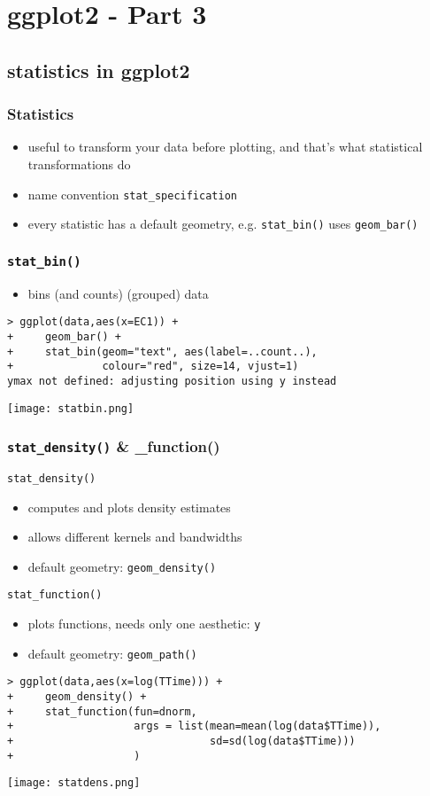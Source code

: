 \section{ggplot2 - Part 3}
\subsection{statistics in ggplot2}
\begin{frame}\frametitle{Statistics}
  \begin{itemize}
  \item useful to transform your data before plotting, and that's what statistical transformations do
  \item name convention \texttt{stat\_specification}
  \item every statistic has a default geometry, e.g. \texttt{stat\_bin()} uses \texttt{geom\_bar()}
  \end{itemize}
\end{frame}


\begin{frame}\frametitle{\texttt{stat\_bin()}}
  \begin{itemize}
  \item bins (and counts) (grouped) data 
  \end{itemize}
\small
\begin{verbatim}
> ggplot(data,aes(x=EC1)) +
+     geom_bar() +
+     stat_bin(geom="text", aes(label=..count..),
+              colour="red", size=14, vjust=1)
ymax not defined: adjusting position using y instead
\end{verbatim}
\begin{center}
  \texttt{[image: statbin.png]}
\end{center}
\end{frame}


\begin{frame}\frametitle{\texttt{stat\_density()} \& \_function()}
\texttt{stat\_density()}
  \begin{itemize}
  \item computes and plots density estimates
  \item allows different kernels and bandwidths
  \item default geometry: \texttt{geom\_density()}
  \end{itemize}
\texttt{stat\_function()}
  \begin{itemize}
  \item plots functions, needs only one aesthetic: \texttt{y}
  \item default geometry: \texttt{geom\_path()}
  \end{itemize}
\small
\begin{verbatim}
> ggplot(data,aes(x=log(TTime))) +
+     geom_density() +
+     stat_function(fun=dnorm,
+                   args = list(mean=mean(log(data$TTime)),
+                               sd=sd(log(data$TTime)))
+                   )
\end{verbatim}
\begin{center}
  \texttt{[image: statdens.png]}
\end{center}
\end{frame}



